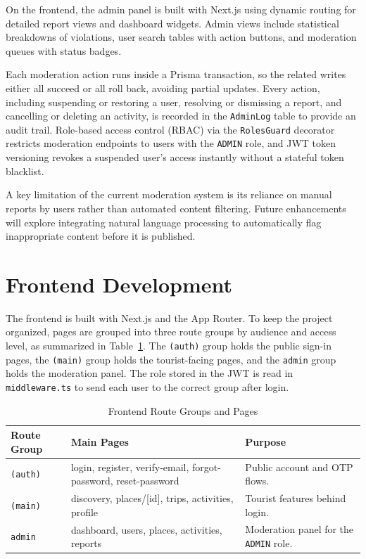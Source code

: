 \documentclass[a4paper,12pt]{report}
\begin{document}
On the frontend, the admin panel is built with Next.js using dynamic routing for detailed report views and dashboard widgets. Admin views include statistical breakdowns of violations, user search tables with action buttons, and moderation queues with status badges.

Each moderation action runs inside a Prisma transaction, so the related writes either all succeed or all roll back, avoiding partial updates. Every action, including suspending or restoring a user, resolving or dismissing a report, and cancelling or deleting an activity, is recorded in the \texttt{AdminLog} table to provide an audit trail. Role-based access control (RBAC) via the \texttt{RolesGuard} decorator restricts moderation endpoints to users with the \texttt{ADMIN} role, and JWT token versioning revokes a suspended user's access instantly without a stateful token blacklist.

A key limitation of the current moderation system is its reliance on manual reports by users rather than automated content filtering. Future enhancements will explore integrating natural language processing to automatically flag inappropriate content before it is published.

\section{Frontend Development}

The frontend is built with Next.js and the App Router. To keep the project organized, pages are grouped into three route groups by audience and access level, as summarized in Table~\ref{tab:route_groups}. The \texttt{(auth)} group holds the public sign-in pages, the \texttt{(main)} group holds the tourist-facing pages, and the \texttt{admin} group holds the moderation panel. The role stored in the JWT is read in \texttt{middleware.ts} to send each user to the correct group after login.

\begin{table}[H]
\centering
\small
\renewcommand{\arraystretch}{1.2}
\begin{tabular}{|p{2.5cm}|p{5.5cm}|p{5cm}|}
\hline
\textbf{Route Group} & \textbf{Main Pages} & \textbf{Purpose} \\ \hline
\texttt{(auth)} & login, register, verify-email, forgot-password, reset-password & Public account and OTP flows. \\ \hline
\texttt{(main)} & discovery, places/[id], trips, activities, profile & Tourist features behind login. \\ \hline
\texttt{admin} & dashboard, users, places, activities, reports & Moderation panel for the \texttt{ADMIN} role. \\ \hline
\end{tabular}
\caption{Frontend Route Groups and Pages}
\label{tab:route_groups}
\end{table}
\end{document}
